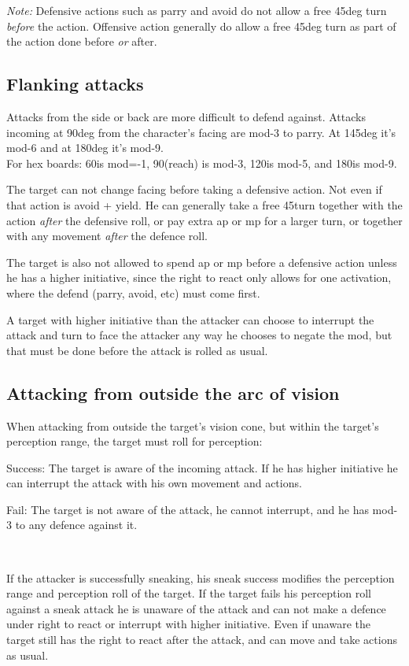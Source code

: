 \emph{Note:} Defensive actions such as parry and avoid do not allow a free 45deg turn \emph{before} the action. Offensive action generally do allow a free 45deg turn as part of the action done before \emph{or} after.


\subsection*{Flanking attacks}
Attacks from the side or back are more difficult to defend against. Attacks incoming at 90deg from the character's facing are mod-3 to parry. At 145deg it's mod-6 and at 180deg it's mod-9.\\
For hex boards: 60\degrees is mod=-1, 90\degrees (reach) is mod-3, 120\degrees is mod-5, and 180\degrees is mod-9.

The target can not change facing before taking a defensive action. Not even if that action is avoid + yield. He can generally take a free 45\degrees turn together with the action \emph{after} the defensive roll, or pay extra ap or mp for a larger turn, or together with any movement \emph{after} the defence roll.

The target is also not allowed to spend ap or mp before a defensive action unless he has a higher initiative, since the right to react only allows for one activation, where the defend (parry, avoid, etc) must come first.

A target with higher initiative than the attacker can choose to interrupt the attack and turn to face the attacker any way he chooses to negate the mod, but that must be done before the attack is rolled as usual.


\subsection*{Attacking from outside the arc of vision}
When attacking from outside the target's vision cone, but within the target's perception range, the target must roll for perception:

\noindent Success: The target is aware of the incoming attack. If he has higher initiative he can interrupt the attack with his own movement and actions.

\noindent Fail: The target is not aware of the attack, he cannot interrupt, and he has mod-3 to any defence against it.

\

If the attacker is successfully sneaking, his sneak success modifies the perception range and perception roll of the target. If the target fails his perception roll against a sneak attack he is unaware of the attack and can not make a defence under right to react or interrupt with higher initiative. Even if unaware the target still has the right to react after the attack, and can move and take actions as usual.


